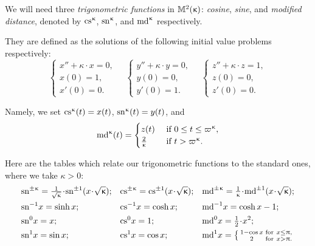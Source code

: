 We will need three \textit{trigonometric functions} in $\mathbb{M}_{{}}^{2}({\upkappa})$: {}\emph{cosine}, {}\emph{sine}, and {}\emph{modified distance}, denoted by $\mathrm{cs}^{\upkappa}$, $\mathrm{sn}^{\upkappa}$, and $\mathrm{md}^{\upkappa}$  respectively. 

They are defined as the solutions of the following initial value problems respectively:
\[
\begin{cases}
 x''+\kappa\cdot x=0,\\
 x(0)=1,\\
 x'(0)=0.
 \end{cases} 
 \quad 
 \begin{cases}
 y''+\kappa\cdot y=0,\\
 y(0)=0,\\
 y'(0)=1.
 \end{cases} 
\quad
 \begin{cases}
 z''+\kappa\cdot z=1,\\
 z(0)=0,\\
 z'(0)=0.
 \end{cases} 
\]

Namely, we set $\mathrm{cs}^{\upkappa}(t)=x(t)$, $\mathrm{sn}^{\upkappa}(t)=y(t)$, and 
\[
\md\kappa(t)=
\begin{cases}
z(t)& \textrm{ if } 0\le t\le \varpi\kappa,
\\
\tfrac{2}{\kappa}& \textrm{ if } t> \varpi\kappa.
\end{cases}
\]

Here are the tables which relate our trigonometric functions to the standard ones, where 
we take $\kappa>0$:
{\small
\begin{align*}
&\sn{\pm\kappa}=\tfrac{1}{\sqrt{\kappa}}\cdot \sn{\pm1}({x}\cdot {\sqrt{\kappa}});
&
&\cs{\pm\kappa}=\cs{\pm1}({x}\cdot {\sqrt{\kappa}});
&
&\md{\pm\kappa}
=
\tfrac{1}{\kappa}\cdot \md{\pm1}({x}\cdot {\sqrt{\kappa}});
\\
&\sn{-1} x=\sinh x;
&
&\cs{-1} x=\cosh x;
&
&\md{-1} x=\cosh x-1;
\\
&\sn{0} x=x;
&
&\cs{0} x=1;
&
&\md{0} x=\tfrac{1}{2}\cdot x^2; 
\\
&\sn{1} x=\sin x;
&
&\cs{1} x= \cos x;
&
&\md{1} x
=
\left\{\begin{smallmatrix}
1-\cos x&\text{for}\ x\le \pi,
\\
2&\text{for}\ x >\pi.
\end{smallmatrix}
\right.
\end{align*}
}


